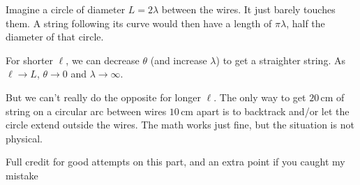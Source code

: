 \documentclass{article}
\begin{document}
{Imagine a circle of diameter $L = 2\lambda$ between the wires. It just barely touches them. A string following its curve would then have a length of $\pi \lambda$, half the diameter of that circle.

For shorter $\ell$, we can decrease $\theta$ (and increase $\lambda$) to get a straighter string. As $\ell \rightarrow L$, $\theta \rightarrow 0$ and $\lambda \rightarrow \infty$.

But we can't really do the opposite for longer $\ell$. The only way to get $20 \, \text{cm}$ of string on a circular arc between wires $10 \, \text{cm}$ apart is to backtrack and/or let the circle extend outside the wires. The math works just fine, but the situation is not physical.

Full credit for good attempts on this part, and an extra point if you caught my mistake

}
\end{document}
